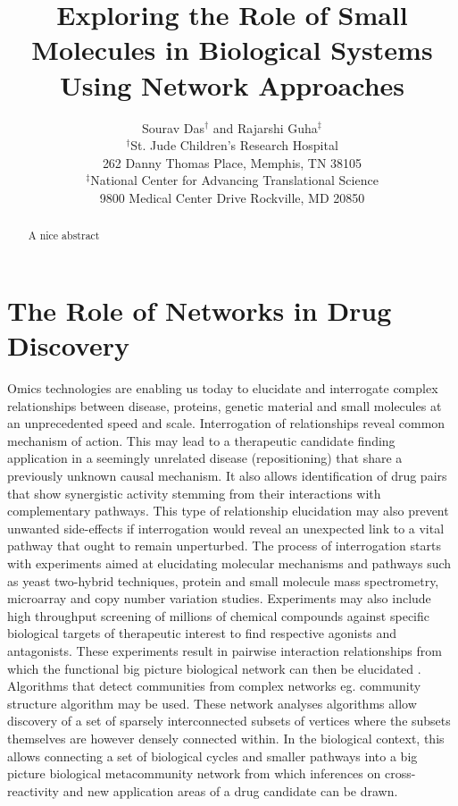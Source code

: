 \documentclass[12pt,letterpaper]{article}
\begin{document}
\title{Exploring the Role of Small Molecules in Biological Systems Using Network Approaches}
\author{Sourav Das$^\dagger$ and Rajarshi Guha$^\ddagger$\\
$^\dagger$St. Jude Children's Research Hospital \\ 262 Danny Thomas Place, Memphis, TN 38105 \\
$^\ddagger$National Center for Advancing Translational Science \\ 9800 Medical Center Drive  Rockville, MD 20850}
\date{}

\maketitle
\begin{abstract}
A nice abstract
\end{abstract}

\section{The Role of Networks in Drug Discovery}
\label{sec:role-networks-drug}
Omics technologies are enabling us today to elucidate and interrogate complex relationships between disease, proteins, genetic material and small molecules at an unprecedented speed and scale. Interrogation of relationships reveal common mechanism of action. This may lead to a therapeutic candidate finding application in a seemingly unrelated disease (repositioning) that share a previously unknown causal mechanism. It also allows identification of drug pairs that show synergistic activity stemming from their interactions with complementary pathways. This type of relationship elucidation may also prevent unwanted side-effects if interrogation would reveal an unexpected link to a vital pathway that ought to remain unperturbed. The process of interrogation starts with experiments aimed at elucidating molecular mechanisms and pathways such as yeast two-hybrid techniques, protein and small molecule mass spectrometry, microarray and copy number variation studies. Experiments may also include high throughput screening of millions of chemical compounds against specific biological targets of therapeutic interest to find respective agonists and antagonists. These experiments result in pairwise interaction relationships from which the functional big picture biological network can then be elucidated \cite{Wu2010}. Algorithms that detect communities from complex networks eg. community structure algorithm \cite{girvan2002community} may be used. These network analyses algorithms allow discovery of a set of sparsely interconnected subsets of vertices where the subsets themselves are however densely connected within. In the biological context, this allows connecting a set of biological cycles and smaller pathways into a big picture biological metacommunity network from which inferences on cross-reactivity and new application areas of a drug candidate can be drawn.
\end{document}
